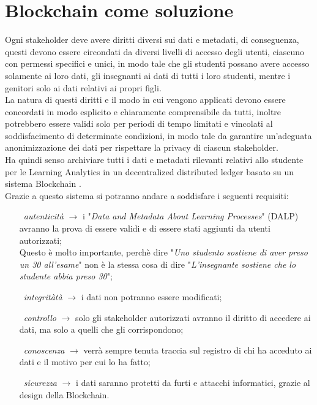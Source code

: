 \newpage
\section{Blockchain come soluzione}
Ogni stakeholder deve avere diritti diversi sui dati e metadati, 
di conseguenza, questi devono essere circondati da diversi livelli di accesso degli utenti, ciascuno con permessi specifici e unici,
in modo tale che gli studenti possano avere accesso solamente ai loro dati, gli insegnanti ai dati di tutti i loro studenti, mentre i genitori solo ai dati relativi ai propri figli.
\\La natura di questi diritti e il modo in cui vengono applicati devono essere concordati in modo esplicito e chiaramente comprensibile da tutti, 
inoltre potrebbero essere validi solo per periodi di tempo limitati e vincolati al soddisfacimento di determinate condizioni, in modo tale da garantire un'adeguata anonimizzazione dei dati per rispettare la privacy di ciascun stakeholder.
\\Ha quindi senso archiviare tutti i dati e metadati rilevanti relativi allo studente per le Learning Analytics in un decentralized distributed ledger basato su un sistema Blockchain \cite{Learning_Analytics_Privacy_on_the_Blockchain}.
\\Grazie a questo sistema si potranno andare a soddisfare i seguenti requisiti:
\vspace{1em}
\begin{adjustwidth}{1cm}{0pt}
    \begin{itemize}[itemsep=1ex]
        \item[\textbullet\ \textit{autenticità} $\rightarrow$ ] i "\textit{Data and Metadata About Learning Processes}" (DALP) avranno la prova di essere validi e di essere stati aggiunti da utenti autorizzati;
        \\Questo è molto importante, perchè dire "\textit{Uno studento sostiene di aver preso un 30 all'esame}" non è la stessa cosa di dire "\textit{L'insegnante sostiene che lo studente abbia preso 30}";
        \item[\textbullet\ \textit{integritàtà} $\rightarrow$ ] i dati non potranno essere modificati;
        \item[\textbullet\ \textit{controllo} $\rightarrow$ ] solo gli stakeholder autorizzati avranno il diritto di accedere ai dati, ma solo a quelli che gli corrispondono;
        \item[\textbullet\ \textit{conoscenza} $\rightarrow$ ] verrà sempre tenuta traccia sul registro di chi ha acceduto ai dati e il motivo per cui lo ha fatto;
        \item[\textbullet\ \textit{sicurezza} $\rightarrow$ ] i dati saranno protetti da furti e attacchi informatici, grazie al design della Blockchain.
    \end{itemize}
\end{adjustwidth}
